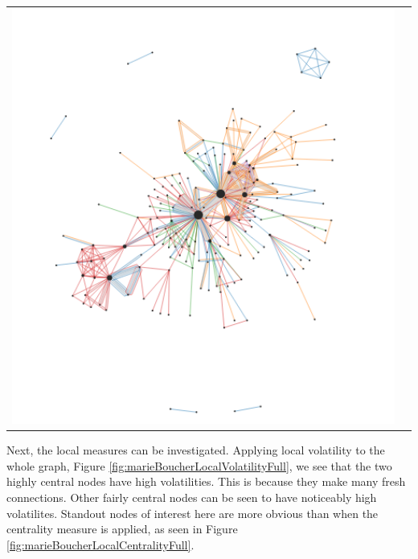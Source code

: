 \begin{center}
\begin{tabular}{cc}
\includegraphics[trim={0 0 0 0}, width=140mm]{./Figures/marieBoucherLocalVolatilityFull.png}
\end{tabular}
\label{fig:marieBoucherLocalVolatilityFull}
\end{center}   
Next, the local measures can be investigated. Applying local volatility to the whole graph, Figure \ref{fig:marieBoucherLocalVolatilityFull}, we see that the two highly central nodes have high volatilities. This is because they make many fresh connections. Other fairly central nodes can be seen to have noticeably high volatilites. Standout nodes of interest here are more obvious than when the centrality measure is applied, as seen in Figure \ref{fig:marieBoucherLocalCentralityFull}.
